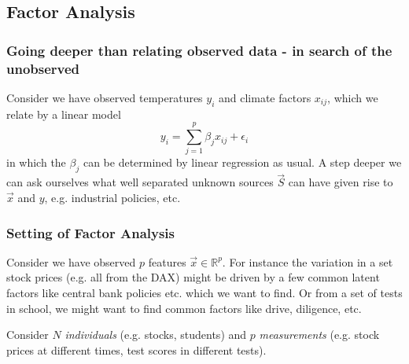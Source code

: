 

\subsection{Factor Analysis}
\subsubsection{Going deeper than relating observed data - in search of the unobserved}
Consider we have observed temperatures $y_i$ and climate factors $x_{ij}$, which we relate
by a linear model
\begin{equation}
    y_i = \sum_{j=1}^{p} \beta_j x_{ij} + \epsilon_i
\end{equation}
in which the $\beta_j$ can be determined by linear regression as usual.
A step deeper we can ask ourselves what well separated unknown sources
$\vec{S}$ can have given rise to $\vec{x}$ and $y$, e.g. industrial policies, etc.

\subsubsection{Setting of Factor Analysis}
Consider we have observed $p$ features $\vec{x} \in \mathbb{R}^{p}$.
For instance the variation in a set stock prices (e.g. all from the DAX) might be driven by a few common latent factors
like central bank policies etc. which we want to find. Or from a set of tests in school, we might want
to find common factors like drive, diligence, etc.

Consider $N$ \textit{individuals} (e.g. stocks, students) and $p$ \textit{measurements} (e.g. stock prices at different
times, test scores in different tests).

